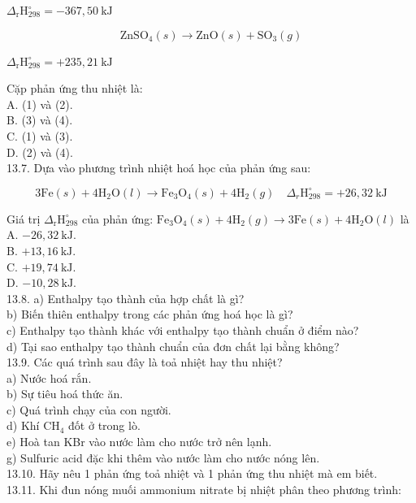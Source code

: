 \documentclass[10pt]{article}
\begin{document}
$\Delta_{\mathrm{r}} \mathrm{H}_{298}^{\circ}=-367,50 \mathrm{~kJ}$


\begin{equation*}
\mathrm{ZnSO}_{4}(s) \rightarrow \mathrm{ZnO}(s)+\mathrm{SO}_{3}(g) \tag{4}
\end{equation*}


$\Delta_{\mathrm{r}} \mathrm{H}_{298}^{\circ}=+235,21 \mathrm{~kJ}$

Cặp phản ứng thu nhiệt là:\\
A. (1) và (2).\\
B. (3) và (4).\\
C. (1) và (3).\\
D. (2) và (4).\\
13.7. Dựa vào phương trình nhiệt hoá học của phản ứng sau:

$$
3 \mathrm{Fe}(s)+4 \mathrm{H}_{2} \mathrm{O}(l) \rightarrow \mathrm{Fe}_{3} \mathrm{O}_{4}(s)+4 \mathrm{H}_{2}(g) \quad \Delta_{r} \mathrm{H}_{298}^{\circ}=+26,32 \mathrm{~kJ}
$$

Giá trị $\Delta_{\mathrm{r}} \mathrm{H}_{298}^{\circ}$ của phản ứng: $\mathrm{Fe}_{3} \mathrm{O}_{4}(s)+4 \mathrm{H}_{2}(g) \rightarrow 3 \mathrm{Fe}(s)+4 \mathrm{H}_{2} \mathrm{O}(l)$ là\\
A. $-26,32 \mathrm{~kJ}$.\\
B. $+13,16 \mathrm{~kJ}$.\\
C. $+19,74 \mathrm{~kJ}$.\\
D. $-10,28 \mathrm{~kJ}$.\\
13.8. a) Enthalpy tạo thành của hợp chất là gì?\\
b) Biến thiên enthalpy trong các phản ứng hoá học là gì?\\
c) Enthalpy tạo thành khác với enthalpy tạo thành chuẩn ở điểm nào?\\
d) Tại sao enthalpy tạo thành chuẩn của đơn chất lại bằng không?\\
13.9. Các quá trình sau đây là toả nhiệt hay thu nhiệt?\\
a) Nước hoá rắn.\\
b) Sự tiêu hoá thức ăn.\\
c) Quá trình chạy của con người.\\
d) Khí $\mathrm{CH}_{4}$ đốt ở trong lò.\\
e) Hoà tan KBr vào nước làm cho nước trở nên lạnh.\\
g) Sulfuric acid đặc khi thêm vào nước làm cho nước nóng lên.\\
13.10. Hãy nêu 1 phản ứng toả nhiệt và 1 phản ứng thu nhiệt mà em biết.\\
13.11. Khi đun nóng muối ammonium nitrate bị nhiệt phân theo phương trình:
\end{document}
